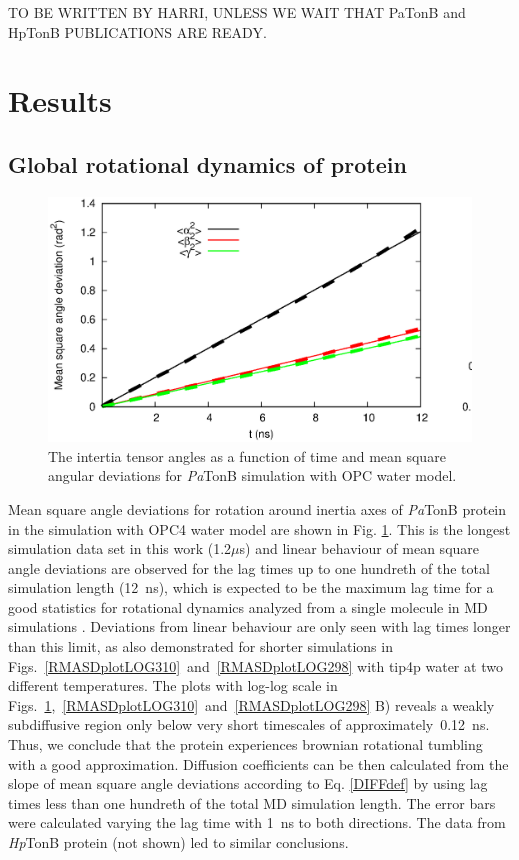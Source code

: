 \documentclass[pre,aps,floatfix,authordate1-4,twocolumn]{revtex4-1}
\begin{document}
TO BE WRITTEN BY HARRI, UNLESS WE WAIT THAT PaTonB and HpTonB PUBLICATIONS
ARE READY.

\section{Results}

\subsection{Global rotational dynamics of protein}
\begin{figure}[htb]
  \includegraphics[width=16.5cm]{../Figs/RMASDplotPsTonBOPC4.eps}%
  \caption{The intertia tensor angles as a function of time and mean square angular
    deviations for {\it Pa}TonB simulation with OPC water model.
    \label{RMASDplot}}%
\end{figure}

Mean square angle deviations for rotation around inertia axes
of {\it Pa}TonB protein in the simulation with OPC4 water model
are shown in Fig. \ref{RMASDplot}. This is the longest
simulation data set in this work (1.2$\mu$s) and
linear behaviour of mean square angle deviations are observed
for the lag times up to one hundreth of the total simulation length (12~ns),
which is expected to be the maximum lag time for a good statistics
for rotational dynamics analyzed from a single molecule in MD simulations \cite{lu06}.
Deviations from linear behaviour are only seen with lag times longer
than this limit, as also demonstrated for shorter simulations in
Figs.~\ref{RMASDplotLOG310}~and~\ref{RMASDplotLOG298} with tip4p water at
two different temperatures. The plots with log-log scale in
Figs.~\ref{RMASDplot},~\ref{RMASDplotLOG310}~and~\ref{RMASDplotLOG298} B)
reveals a weakly subdiffusive region only below very short timescales
of approximately~0.12~ns. Thus, we conclude that the protein
experiences brownian rotational tumbling with  a good approximation.
Diffusion coefficients can be then calculated from the slope of mean square angle
deviations according to Eq. \ref{DIFFdef} by using lag times less than
one hundreth of the total MD simulation length.
The error bars were calculated varying the lag time with 1~ns to both directions.
The data from {\it Hp}TonB protein (not shown) led to similar conclusions.
\end{document}
